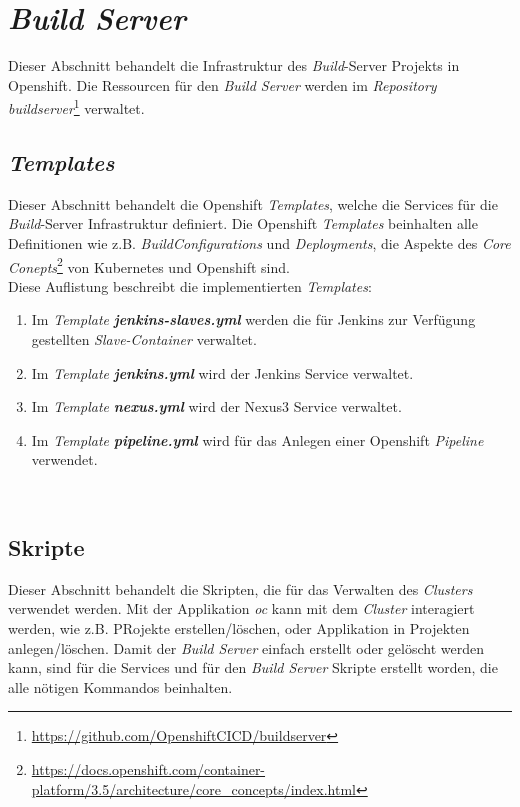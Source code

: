 \section{\emph{Build Server}}
\label{sec:buildserver}
Dieser Abschnitt behandelt die Infrastruktur des \emph{Build}-Server Projekts in Openshift. 
Die Ressourcen für den \emph{Build Server} werden im \emph{Repository buildserver}\footnote{\url{https://github.com/OpenshiftCICD/buildserver}} verwaltet.

\subsection{\emph{Templates}}
\label{sec:openshift-templates}
Dieser Abschnitt behandelt die Openshift \emph{Templates}, welche die Services für die \emph{Build}-Server Infrastruktur definiert. Die Openshift \emph{Templates} beinhalten alle Definitionen wie z.B. \emph{BuildConfigurations} und \emph{Deployments}, die Aspekte des \emph{Core Conepts}\footnote{\url{https://docs.openshift.com/container-platform/3.5/architecture/core_concepts/index.html}} von Kubernetes und Openshift sind.\\

Diese Auflistung beschreibt die implementierten \emph{Templates}:
\begin{enumerate}
	\item Im \emph{Template} \textbf{\emph{jenkins-slaves.yml}} werden die für Jenkins zur Verfügung gestellten \emph{Slave-Container} verwaltet.
	\item Im \emph{Template} \textbf{\emph{jenkins.yml}} wird der Jenkins Service verwaltet.
	\item Im \emph{Template} \textbf{\emph{nexus.yml}} wird der Nexus3 Service verwaltet.
	\item Im \emph{Template} \textbf{\emph{pipeline.yml}} wird für das Anlegen einer Openshift \emph{Pipeline} verwendet.
\end{enumerate}

\ \subsection{Skripte}
Dieser Abschnitt behandelt die Skripten, die für das Verwalten des \emph{Clusters} verwendet werden. Mit der Applikation \emph{oc} kann mit dem \emph{Cluster} interagiert werden, wie z.B. PRojekte erstellen/löschen, oder Applikation in Projekten anlegen/löschen. Damit der \emph{Build Server} einfach erstellt oder gelöscht werden kann, sind für die Services und für den \emph{Build Server}   
Skripte erstellt worden, die alle nötigen Kommandos beinhalten.\\

